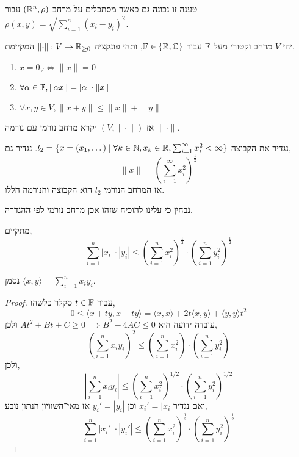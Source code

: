 \begin{remark}
	טענה זו נכונה גם כאשר מסתכלים על מרחב $(\mathbb{R}^n, \rho)$ עבור $\rho(x, y) = \sqrt{\sum_{i = 1}^{n} {(x_i - y_i)}^2}$.
\end{remark}
\begin{definition}
	יהי $V$ מרחב וקטורי מעל $\mathbb{F}$ עבור $\mathbb{F} \in \{ \mathbb{R}, \mathbb{C} \}$, ותהי פונקציה $\lVert \cdot \rVert : V \to \mathbb{R}_{\ge0}$ המקיימת,
	\begin{enumerate}
		\item $x = 0_V \iff \lVert x \rVert = 0$
		\item $\forall \alpha \in \mathbb{F}, \lVert \alpha x \rVert = |\alpha| \cdot \lVert x \rVert$
		\item $\forall x, y \in V, \lVert x + y \rVert \le \lVert x \rVert + \lVert y \rVert$
	\end{enumerate}
	אז $(V, \lVert \cdot \rVert)$ יקרא מרחב נורמי עם נורמה $\lVert \cdot \rVert$.
\end{definition}
\begin{definition}[מרחב l2]
	נגדיר את הקבוצה $l_2 = \{ x = (x_1, \dots) \mid \forall k \in \mathbb{N}, x_k \in \mathbb{R}, \sum_{i = 1}^{\infty} x_i^2 < \infty \}$.
	נגדיר גם,
	\[
		\lVert x \rVert = {\left(\sum_{i = 1}^{\infty} x_i^2\right)}^{\frac{1}{2}}
	\]
	אז המרחב הנורמי $l_2$ הוא הקבוצה והנורמה הללו.
\end{definition}
נבחין כי עלינו להוכיח שזהו אכן מרחב נורמי לפי ההגדרה.
\begin{theorem}
	מתקיים,
	\[
		\sum_{i = 1}^{n} |x_i| \cdot |y_i|
		\le {\left( \sum_{i = 1}^{n} x_i^2 \right)}^{\frac{1}{2}} \cdot {\left( \sum_{i = 1}^{n} y_i^2 \right)}^{\frac{1}{2}}
	\]
\end{theorem}
\begin{notation}
	נסמן $\langle x, y \rangle = \sum_{i = 1}^{n}  x_i y_i$.
\end{notation}
\begin{proof}
	עבור $t \in \mathbb{F}$ סקלר כלשהו,
	\[
		0
		\le \langle x + ty, x + ty \rangle
		= \langle x, x \rangle + 2t \langle x, y \rangle + \langle y, y \rangle t^2
	\]
	עובדה ידועה היא $At^2 + Bt + C \ge 0 \implies B^2 - 4AC \le 0$ ולכן,
	\[
		{\left( \sum_{i = 1}^{n} x_i y_i \right)}^2
		\le {\left( \sum_{i = 1}^{n} x_i^2 \right)} \cdot {\left( \sum_{i = 1}^{n} y_i^2 \right)}
	\]
	ולכן,
	\[
		\left\lvert \sum_{i = 1}^{n} x_i y_i \right\rvert
		\le {\left( \sum_{i = 1}^{n} x_i^2 \right)}^{1/2} \cdot {\left( \sum_{i = 1}^{n} y_i^2 \right)}^{1/2}
	\]
	ואם נגדיר $x_i' = |x_i$ וכן $y_i' = |y_i|$ אז מאי־השוויון הנתון נובע,
	\[
		\sum_{i = 1}^{n} |x_i'| \cdot |y_i'|
		\le {\left( \sum_{i = 1}^{n} x_i^2 \right)}^{\frac{1}{2}} \cdot {\left( \sum_{i = 1}^{n} y_i^2 \right)}^{\frac{1}{2}}
	\]
\end{proof}
